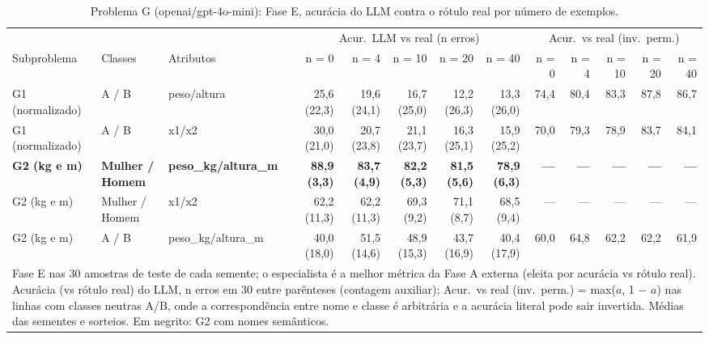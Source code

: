 \begin{table}[htbp]
\centering
\footnotesize
\caption{Problema G (openai/gpt-4o-mini): Fase E, acurácia do LLM contra o rótulo real por número de exemplos.}
\label{tab:bloco3_G_faseE_nshot_gpt4mini}
\begin{tabular}{lllrrrrrrrrrr}
\toprule
 &  &  & \multicolumn{5}{c}{Acur.\ LLM vs real (n erros)} & \multicolumn{5}{c}{Acur.\ vs real (inv.\ perm.)} \\ \cmidrule(lr){4-8} \cmidrule(lr){9-13}
Subproblema & Classes & Atributos & n = 0 & n = 4 & n = 10 & n = 20 & n = 40 & n = 0 & n = 4 & n = 10 & n = 20 & n = 40 \\
\midrule
G1 (normalizado) & A / B & peso/altura & 25,6 (22,3) & 19,6 (24,1) & 16,7 (25,0) & 12,2 (26,3) & 13,3 (26,0) & 74,4 & 80,4 & 83,3 & 87,8 & 86,7 \\
G1 (normalizado) & A / B & x1/x2 & 30,0 (21,0) & 20,7 (23,8) & 21,1 (23,7) & 16,3 (25,1) & 15,9 (25,2) & 70,0 & 79,3 & 78,9 & 83,7 & 84,1 \\
\textbf{G2 (kg e m)} & \textbf{Mulher / Homem} & \textbf{peso\_kg/altura\_m} & \textbf{88,9 (3,3)} & \textbf{83,7 (4,9)} & \textbf{82,2 (5,3)} & \textbf{81,5 (5,6)} & \textbf{78,9 (6,3)} & \textbf{—} & \textbf{—} & \textbf{—} & \textbf{—} & \textbf{—} \\
G2 (kg e m) & Mulher / Homem & x1/x2 & 62,2 (11,3) & 62,2 (11,3) & 69,3 (9,2) & 71,1 (8,7) & 68,5 (9,4) & — & — & — & — & — \\
G2 (kg e m) & A / B & peso\_kg/altura\_m & 40,0 (18,0) & 51,5 (14,6) & 48,9 (15,3) & 43,7 (16,9) & 40,4 (17,9) & 60,0 & 64,8 & 62,2 & 62,2 & 61,9 \\
\bottomrule
\multicolumn{13}{p{0.95\linewidth}}{\footnotesize Fase E nas 30 amostras de teste de cada semente; o especialista é a melhor métrica da Fase A externa (eleita por acurácia vs rótulo real). Acurácia (vs rótulo real) do LLM, n erros em 30 entre parênteses (contagem auxiliar); Acur.\ vs real (inv.\ perm.) = max($a$, 1 $-$ $a$) nas linhas com classes neutras A/B, onde a correspondência entre nome e classe é arbitrária e a acurácia literal pode sair invertida. Médias das sementes e sorteios. Em negrito: G2 com nomes semânticos.} \\
\end{tabular}
\end{table}
